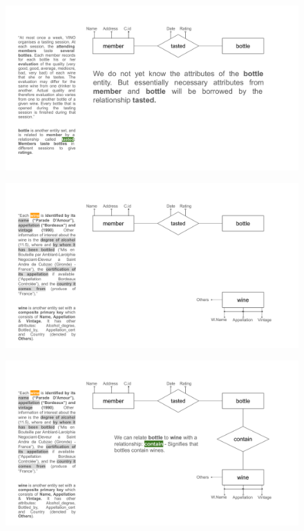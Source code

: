 \documentclass{beamer}
\begin{document}
\begin{frame}
    \begin{figure}
        \centering
        \includegraphics[width=1.1\linewidth]{tut_02_files/03.pdf}
    \end{figure}
\end{frame}

\begin{frame}
    \begin{figure}
        \centering
        \includegraphics[width=1.1\linewidth]{tut_02_files/04.pdf}
    \end{figure}
\end{frame}

\begin{frame}
    \begin{figure}
        \centering
        \includegraphics[width=1.1\linewidth]{tut_02_files/05.pdf}
    \end{figure}
\end{frame}
\end{document}

